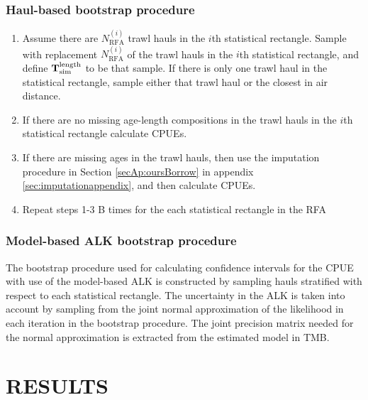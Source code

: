\documentclass[a4paper 12pt]{article}
\numberwithin{equation}{section}
\begin{document}
 
\subsubsection{Haul-based bootstrap procedure} 

\begin{enumerate}
\item Assume there are $N_{\text{RFA}}^{(i)}$ trawl hauls in the $i$th statistical rectangle.  Sample with replacement $N_{\text{RFA}}^{(i)}$ of the trawl hauls in the $i$th statistical rectangle, and define ${\bf T}_{\text{sim}}^{\text{length}}$ to be that sample. If there is only one trawl haul in the statistical rectangle, sample either that trawl haul or the closest in air distance. 
\item If there are no missing age-length compositions in the trawl hauls in the $i$th statistical rectangle calculate CPUEs. 
\item If there are missing ages in the trawl hauls, then use the imputation procedure in Section \ref{secAp:oursBorrow} in appendix  \ref{sec:imputationappendix}, and then calculate CPUEs.
\item Repeat steps 1-3 B times for the each statistical rectangle in the RFA 
\end{enumerate}

 
\subsubsection{Model-based ALK bootstrap procedure}
The bootstrap procedure used for calculating confidence intervals for the CPUE with use of the model-based ALK is constructed by sampling hauls stratified with respect to each statistical rectangle. The uncertainty in the ALK is taken into account by sampling from the joint normal approximation of the likelihood in each iteration in the bootstrap procedure. The joint precision matrix needed for the normal approximation is extracted from the estimated model in TMB. 

\section{RESULTS}
\label{sec:results}
\end{document}
